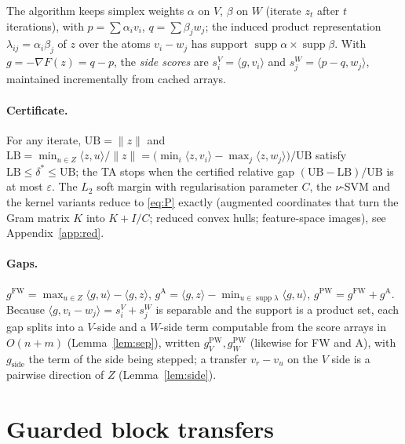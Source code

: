 \documentclass{opt2026}   %
\newcommand{\ip}[2]{\langle #1, #2 \rangle}
\newcommand{\norm}[1]{\lVert #1 \rVert}
\newcommand{\gFW}{g^{\mathrm{FW}}}
\newcommand{\gA}{g^{\mathrm{A}}}
\newcommand{\gPW}{g^{\mathrm{PW}}}
\newcommand{\UB}{\mathrm{UB}}
\newcommand{\LB}{\mathrm{LB}}
\begin{document}
The algorithm keeps simplex weights $\alpha$ on $V$, $\beta$ on $W$
(iterate $z_t$ after $t$ iterations),
with $p=\sum\alpha_iv_i$, $q=\sum\beta_jw_j$; the induced product
representation $\lambda_{ij}=\alpha_i\beta_j$ of $z$ over the atoms
$v_i-w_j$ has support $\operatorname{supp}\alpha\times\operatorname{supp}\beta$.
With $g=-\nabla F(z)=q-p$, the \emph{side scores} are
$s^V_i=\ip{g}{v_i}$ and $s^W_j=\ip{p-q}{w_j}$, maintained incrementally
from cached arrays.

\paragraph{Certificate.} For any iterate, $\UB=\norm z$ and
$\LB=\min_{u\in Z}\ip{z}{u}/\norm z=\big(\min_i\ip{z}{v_i}-\max_j\ip{z}{w_j}\big)/\UB$
satisfy $\LB\le\delta^*\le\UB$; the TA stops when the certified
relative gap $(\UB-\LB)/\UB$ is at most $\varepsilon$. The $L_2$ soft margin with regularisation
parameter $C$, the $\nu$-SVM and the kernel variants reduce to
\eqref{eq:P} exactly (augmented coordinates that turn the Gram matrix
$K$ into $K+I/C$; reduced convex hulls; feature-space images), see
Appendix~\ref{app:red}.

\paragraph{Gaps.} $\gFW=\max_{u\in Z}\ip{g}{u}-\ip{g}{z}$,
$\gA=\ip{g}{z}-\min_{u\in\operatorname{supp}\lambda}\ip{g}{u}$,
$\gPW=\gFW+\gA$. Because $\ip{g}{v_i-w_j}=s^V_i+s^W_j$ is separable and
the support is a product set, each gap splits into a $V$-side and a
$W$-side term computable from the score arrays in $O(n+m)$
(Lemma~\ref{lem:sep}), written $\gPW_V,\gPW_W$ (likewise for FW and A),
with $g_{\text{side}}$ the term of the side being stepped; a transfer
$v_r-v_u$ on the $V$ side is a pairwise direction of $Z$
(Lemma~\ref{lem:side}).

\section{Guarded block transfers}\label{sec:alg}
\end{document}
